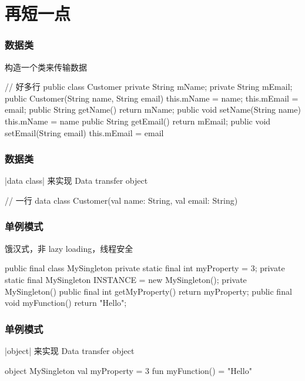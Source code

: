 \section{再短一点}
\begin{frame}[fragile]
\frametitle{数据类}
\begin{quotebox}[penrosered]
    构造一个类来传输数据
\end{quotebox}
\begin{javacode}[basicstyle=\scriptsize\ttfamily,emph={[1]Customer}]
    // 好多行
    public class Customer {
        private String mName;
        private String mEmail;
        public Customer(String name, String email) {
            this.mName = name;
            this.mEmail = email;
        }
        public String getName() { return mName; }
        public void setName(String name) { this.mName = name }
        public String getEmail() { return mEmail; }
        public void setEmail(String email) { this.mEmail = email }
    }
\end{javacode}
\end{frame}

\begin{frame}[fragile]
\frametitle{数据类}
\begin{quotebox}
    |data class| 来实现 Data transfer object
\end{quotebox}
\begin{kotlincode}[emph={[1]Customer}]
    // 一行
    data class Customer(val name: String, val email: String)
\end{kotlincode}
\end{frame}

\begin{frame}[fragile]
\frametitle{单例模式}
\begin{quotebox}[penrosered]
    饿汉式，非 lazy loading，线程安全
\end{quotebox}
\begin{javacode}[basicstyle=\scriptsize\ttfamily,emph={[1]MySingleton}]
    public final class MySingleton {
        private static final int myProperty = 3;
        private static final MySingleton INSTANCE = new MySingleton();
        private MySingleton() {}
        public final int getMyProperty() {
            return myProperty;
        }
        public final void myFunction() {
            return "Hello";
        }
    }
\end{javacode}
\end{frame}

\begin{frame}[fragile]
\frametitle{单例模式}
\begin{quotebox}
    |object| 来实现 Data transfer object
\end{quotebox}
\begin{kotlincode}[emph={[1]MySingleton}]
    object MySingleton {
        val myProperty = 3
        fun myFunction() = "Hello"
    }
\end{kotlincode}
\end{frame}

